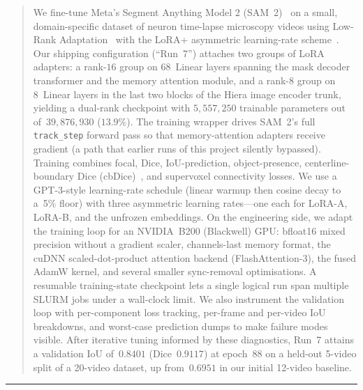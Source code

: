 \documentclass[11pt,a4paper]{article}
\begin{document}
\begin{abstract}
\noindent
We fine-tune Meta's Segment Anything Model 2 (SAM~2)~\cite{sam2} on a small,
domain-specific dataset of neuron time-lapse microscopy videos using
Low-Rank Adaptation~\cite{lora} with the LoRA+ asymmetric learning-rate
scheme~\cite{loraplus}. Our shipping configuration (``Run~7'') attaches
two groups of LoRA adapters: a rank-$16$ group on 68~Linear layers
spanning the mask decoder transformer and the memory attention module,
and a rank-$8$ group on 8~Linear layers in the last two blocks of the
Hiera image encoder trunk, yielding a dual-rank checkpoint with
$5{,}557{,}250$ trainable parameters out of~$39{,}876{,}930$
($13.9\%$). The training wrapper drives SAM~2's full
\texttt{track\_step} forward pass so that memory-attention adapters
receive gradient (a path that earlier runs of this project silently
bypassed). Training combines focal, Dice, IoU-prediction, object-presence,
centerline-boundary Dice (cbDice)~\cite{cbdice}, and supervoxel
connectivity losses. We use a GPT-3-style learning-rate
schedule (linear warmup then cosine decay to a~5\% floor) with three
asymmetric learning rates---one each for LoRA-A, LoRA-B, and the
unfrozen embeddings.
On the engineering side, we adapt the training loop for an NVIDIA~B200
(Blackwell) GPU: bfloat16 mixed precision without a gradient scaler,
channels-last memory format, the cuDNN scaled-dot-product attention
backend (FlashAttention-3), the fused AdamW kernel, and several smaller
sync-removal optimisations. A resumable training-state checkpoint lets
a single logical run span multiple SLURM jobs under a wall-clock limit.
We also instrument the validation loop with per-component loss
tracking, per-frame and per-video IoU breakdowns, and worst-case
prediction dumps to make failure modes visible. After iterative tuning
informed by these diagnostics, Run~7 attains a validation IoU
of~$0.8401$ (Dice~$0.9117$) at epoch~88 on a held-out 5-video split of
a 20-video dataset, up from~$0.6951$ in our initial 12-video baseline.
\end{abstract}

\vspace{0.3em}

\vspace{0.5em}
{\color{rulegray}\hrule height 0.4pt}
\end{document}
